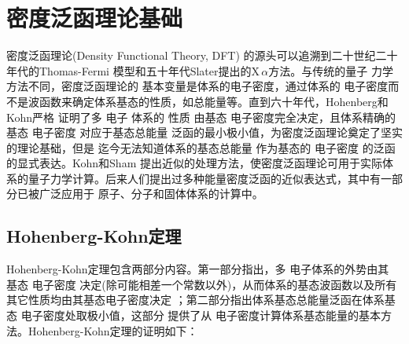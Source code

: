 \chapter{密度泛函{理论}基础} \label{chap:dft}

密度泛函理论(Density Functional Theory, DFT)\cite{Parr-Yang,CR91-651_1991}%
{的源头}可以追溯到二十世纪二十年代的Thomas-Fermi%
{模型}\cite{PCPS23-542_1927,ZP48-73_1928}和五十年代Slater提出的X\,$\alpha$方法\cite{PR81-385_1951}。与传统的量子%
{力}学方法不同，密度泛函理论的%
{基本变量是体系的电子}密度，通过体系的%
{电}子密度而不是波函数来确定体系基态的性质，如总能量等。直到六十年代，Hohenberg和Kohn\cite{PR136-B864_1964}严格%
证明了多%
{电}子%
体系的%
性质%
由基态%
{电}子密度完全决定，且体系精确的基态%
{电}子密度%
{对应于}基态总能量%
{泛函的最小极小值}，为密度泛函理论奠定了坚实的理论基础，但是%
{迄今无法知道}体系的基态总能量%
{作为}基态的%
{电}子密度%
{的泛函的显式表达}。Kohn和\linebreak Sham\cite{PR140-A1133_1965}%
{提出近似的处理方法，使密度泛函理论可用于实际体系的量子力学计算。后来人们提出过多种能量密度泛函的近似表达式，其中有一部分已被}广泛应用于%
原子、分子和固体体系{的计算中\cite{CJP58-1200_1980,PRB45-13244_1992,PRA38-3098_1988,PRB33-8822_1986,PRB37-785_1988}}。

\section{Hohenberg-Kohn定理}
Hohenberg-Kohn定理\cite{PR136-B864_1964}包含两部分{内容}。第一部分指出，多%
{电}子体系的外势由其%
基态%
{电}子密度%
决定(除可能相差一个常数以外)，从而体系的基态波函数以及所有其它性质均由其基态电子密度决定
；第二部分指出体系基态总能量{泛函}在体系基态%
{电}子密度处取极小{值}，这部分%
{提供}了从%
{电}子密度计算体系基态能量的基本方法。Hohenberg-Kohn定理的证明如下：

